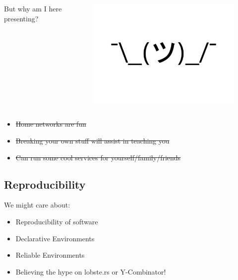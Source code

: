 \documentclass{beamer}
\begin{document}
\begin{frame}
    \begin{columns}
        \begin{column}{0.5\textwidth}
            But why am I here presenting?
        \end{column}
        \begin{column}{0.5\textwidth}
            \begin{figure}
                \centering
                \includegraphics[width=\textwidth,keepaspectratio]{../resources/shrug.jpg}
            \end{figure}
        \end{column}
    \end{columns}
\end{frame}

\begin{frame}
    \begin{itemize}
        \item \st{Home networks are fun}
        \item \st{Breaking your own stuff will assist in teaching you}
        \item \st{Can run some cool services for yourself/family/friends}
    \end{itemize}
\end{frame}

\subsection{Reproducibility}

\begin{frame}
    We might care about:
    \begin{itemize}
        \item Reproducibility of software
        \item Declarative Environments
        \item Reliable Environments
        \item Believing the hype on lobste.rs or Y-Combinator!
    \end{itemize}
\end{frame}
\end{document}
